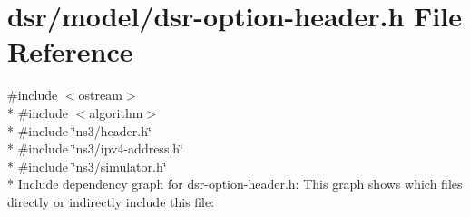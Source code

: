 \hypertarget{dsr-option-header_8h}{}\section{dsr/model/dsr-\/option-\/header.h File Reference}
\label{dsr-option-header_8h}
{\ttfamily \#include $<$ostream$>$}\\*
{\ttfamily \#include $<$algorithm$>$}\\*
{\ttfamily \#include \char`\"{}ns3/header.\+h\char`\"{}}\\*
{\ttfamily \#include \char`\"{}ns3/ipv4-\/address.\+h\char`\"{}}\\*
{\ttfamily \#include \char`\"{}ns3/simulator.\+h\char`\"{}}\\*
Include dependency graph for dsr-\/option-\/header.h\+:
This graph shows which files directly or indirectly include this file\+:
